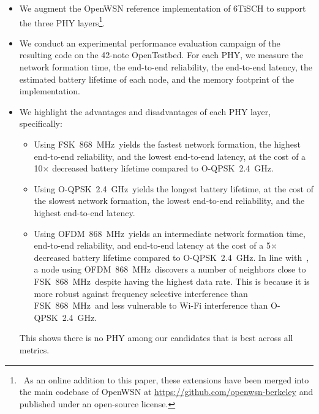 \documentclass[sensors,article,submit,moreauthors,pdftex]{Definitions/mdpi}
\newcommand{\fsk}           {FSK~868~MHz}
\newcommand{\oqpsk}         {O-QPSK~2.4~GHz}
\newcommand{\ofdm}          {OFDM~868~MHz}
\begin{document}
\begin{itemize}
    \item We augment the OpenWSN reference implementation of 6TiSCH to support the three PHY layers\footnote{~As an online addition to this paper, these extensions have been merged into the main codebase of OpenWSN at \url{https://github.com/openwsn-berkeley} and published under an open-source license.}.
    \item We conduct an experimental performance evaluation campaign of the resulting code on the 42-note OpenTestbed.
        For each PHY, we measure 
            the network formation time,
            the end-to-end reliability,
            the end-to-end latency, 
            the estimated battery lifetime of each node, and
            the memory footprint of the implementation.
    \item We highlight the advantages and disadvantages of each PHY layer, specifically:
        \begin{itemize}
            \item Using \fsk\ yields
                the fastest network formation,
                the highest end-to-end reliability, and
                the lowest end-to-end latency,
                    at the cost of
                        a 10$\times$ decreased battery lifetime compared to \oqpsk.
            \item Using \oqpsk\ yields
                the longest battery lifetime,
                    at the cost of
                        the slowest network formation,
                        the lowest end-to-end reliability, and
                        the highest end-to-end latency.
            \item Using \ofdm\ yields
                an intermediate network formation time,
                end-to-end reliability, and
                end-to-end latency
                    at the cost of
                        a 5$\times$ decreased battery lifetime compared to \oqpsk.
                In line with~\cite{munoz18evaluation}, a node using \ofdm\ discovers a number of neighbors close to \fsk\ despite having the highest data rate. 
                    This is because it is more robust against frequency selective interference than \fsk\ and less vulnerable to Wi-Fi interference than \oqpsk.
        \end{itemize}
        This shows there is no PHY among our candidates that is best across all metrics.
\end{itemize}
\end{document}

